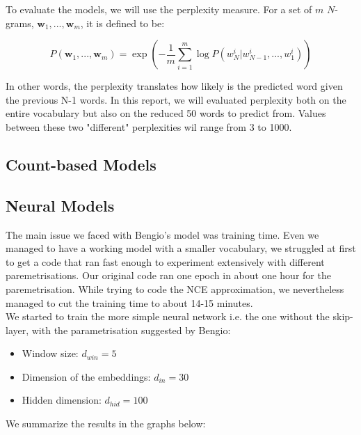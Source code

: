 \documentclass[11pt]{article}
\begin{document}
To evaluate the models, we will use the perplexity measure. For a set of $m$ $N$-grams, $\boldsymbol{w}_1,...,\boldsymbol{w}_m$, it is defined to be:

$$ P(\boldsymbol{w}_1,...,\boldsymbol{w}_m) = \exp\left(-\frac{1}{m} \sum\limits_{i = 1}^{m} \log P(w_N^i|w_{N-1}^i,...,w_1^i)\right)$$

\noindent In other words, the perplexity translates how likely is the predicted word given the previous N-1 words. In this report, we will evaluated perplexity both on the entire vocabulary but also on the reduced 50 words to predict from. Values between these two "different" perplexities wil range from 3 to 1000.
\subsection{Count-based Models}

\subsection{Neural Models}

The main issue we faced with Bengio's model was training time. Even we managed to have a working model with a smaller vocabulary, we struggled at first to get a code that ran fast enough to experiment extensively with different paremetrisations. Our original code ran one epoch in about one hour for the paremetrisation. While trying to code the NCE approximation, we nevertheless managed to cut the training time to about 14-15 minutes.\\

We started to train the more simple neural network i.e. the one without the skip-layer, with the parametrisation suggested by Bengio:

\begin{itemize}
\item Window size: $d_{win} = 5$
\item Dimension of the embeddings: $d_{in} = 30$
\item Hidden dimension: $d_{hid} = 100$
\end{itemize}

We summarize the results in the graphs below:
\end{document}
